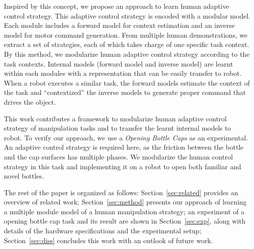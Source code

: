 Inspired by this concept, we propose an approach to learn human adaptive control strategy. This adaptive control strategy is encoded with a modular model. Each module includes a forward model for context estimation and an inverse model for motor command generation. From multiple human demonstrations, we extract a set of strategies, each of which takes charge of one specific task context. By this method, we modularize human adaptive control strategy according to the task contexts. Internal models (forward model and inverse model) are learnt within each modules with a representation that can be easily transfer to robot. When a robot executes a similar task, the forward models estimate the context of the task and ``contextized'' the inverse models to generate proper command that drives the object.

This work contributes a framework to modularize human adaptive control strategy of manipulation tasks and to transfer the learnt internal models to robot. To verify our approach, we use a \emph{Opening Bottle Caps} as an experimental. An adaptive control strategy is required here, as the friction between the bottle and the cap surfaces has multiple phases. We modularize the human control strategy in this task and implementing it on a robot to open both familiar and novel bottles.

The rest of the paper is organized as follows: Section~\ref{sec:related} provides an overview of related work; Section~\ref{sec:method} presents our approach of learning a multiple module model of a human manipulation strategy; an experiment of a opening bottle cap task and its result are shown in Section~\ref{sec:exp}, along with details of the hardware specifications and the experimental setup; Section~\ref{sec:diss} concludes this work with an outlook of future work. 